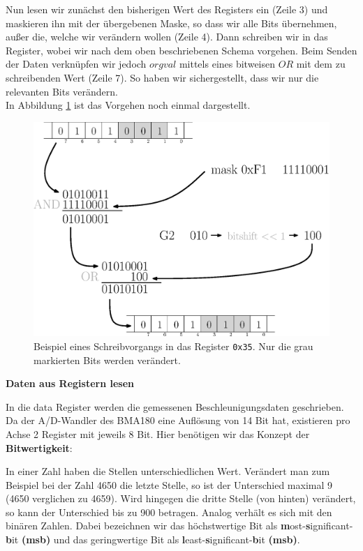 \documentclass[12pt,a4paper]{scrartcl}
\begin{document}
Nun lesen wir zunächst den bisherigen Wert des Registers ein (Zeile 3)  und maskieren ihn mit der übergebenen Maske, so dass wir alle Bits übernehmen, außer die, welche wir verändern wollen (Zeile 4). Dann schreiben wir in das Register, wobei wir nach dem oben beschriebenen Schema vorgehen. Beim Senden der Daten verknüpfen wir jedoch $orgval$ mittels eines bitweisen $OR$ mit dem zu schreibenden Wert (Zeile 7). So haben wir sichergestellt, dass wir nur die relevanten Bits verändern.\\
In Abbildung \ref{bitops} ist das Vorgehen noch einmal dargestellt.

\begin{figure}[H]
\centering
\includegraphics[scale=.5]{bitops.eps}
\caption{Beispiel eines Schreibvorgangs in das Register \texttt{0x35}. Nur die grau markierten Bits werden verändert.}
\label{bitops}
\end{figure}

\textbf{Daten aus Registern lesen}

In die data Register werden die gemessenen Beschleunigungsdaten geschrieben. Da der A/D-Wandler des BMA180 eine Auflösung von 14 Bit hat, existieren pro Achse 2 Register mit jeweils 8 Bit. 
Hier benötigen wir das Konzept der \textbf{Bitwertigkeit}:

In einer Zahl haben die Stellen unterschiedlichen Wert. Verändert man zum Beispiel bei der Zahl 4650 die letzte Stelle, so ist der Unterschied maximal 9 (4650 verglichen zu 4659). Wird hingegen die dritte Stelle (von hinten) verändert, so kann der Unterschied bis zu 900 betragen. Analog verhält es sich mit den binären Zahlen. 
Dabei bezeichnen wir das höchstwertige Bit als \textbf{m}ost-\textbf{s}ignificant-\textbf{b}it \textbf{(msb)} und das geringwertige Bit als \textbf{l}east-\textbf{s}ignificant-\textbf{b}it \textbf{(msb)}.
\end{document}
